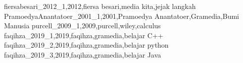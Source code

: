 fiersabesari_2012_1,2012,fiersa besari,media kita,jejak langkah
PramoedyaAnantatoer_2001_1,2001,Pramoedya Anantatoer,Gramedia,Bumi Manusia
purcell_2009_1,2009,purcell,wiley,calculus
faqihza_2019_1,2019,faqihza,gramedia,belajar C++
faqihza_2019_2,2019,faqihza,gramedia,belajar python
faqihza_2019_3,2019,faqihza,gramedia,belajar Java